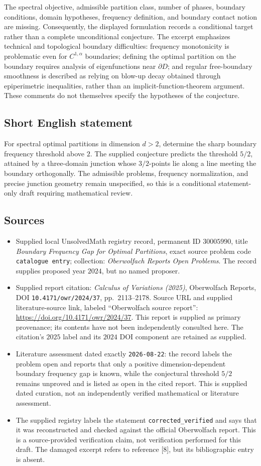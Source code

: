 \documentclass[11pt]{article}
\begin{document}
The spectral objective, admissible partition class, number of phases, boundary conditions, domain hypotheses, frequency definition, and boundary contact notion are missing. Consequently, the displayed formulation records a conditional target rather than a complete unconditional conjecture. The excerpt emphasizes technical and topological boundary difficulties: frequency monotonicity is problematic even for \(C^{1,\alpha}\) boundaries; defining the optimal partition on the boundary requires analysis of eigenfunctions near \(\partial D\); and regular free-boundary smoothness is described as relying on blow-up decay obtained through epiperimetric inequalities, rather than an implicit-function-theorem argument. These comments do not themselves specify the hypotheses of the conjecture.
\subsection{Short English statement}
For spectral optimal partitions in dimension \(d>2\), determine the sharp boundary frequency threshold above \(2\). The supplied conjecture predicts the threshold \(5/2\), attained by a three-domain junction whose \(3/2\)-points lie along a line meeting the boundary orthogonally. The admissible problems, frequency normalization, and precise junction geometry remain unspecified, so this is a conditional statement-only draft requiring mathematical review.
\subsection{Sources}
\begin{itemize}
\item Supplied local UnsolvedMath registry record, permanent ID \(30005990\), title \emph{Boundary Frequency Gap for Optimal Partitions}, exact source problem code \texttt{catalogue entry}; collection: \emph{Oberwolfach Reports Open Problems}. The record supplies proposed year \(2024\), but no named proposer.
\item Supplied report citation: \emph{Calculus of Variations (2025)}, Oberwolfach Reports, DOI \texttt{10.4171/owr/2024/37}, pp.\ 2113--2178. Source URL and supplied literature-source link, labeled ``Oberwolfach source report'': \url{https://doi.org/10.4171/owr/2024/37}. This report is supplied as primary provenance; its contents have not been independently consulted here. The citation's \(2025\) label and its \(2024\) DOI component are retained as supplied.
\item Literature assessment dated exactly \texttt{2026-08-22}: the record labels the problem open and reports that only a positive dimension-dependent boundary frequency gap is known, while the conjectural threshold \(5/2\) remains unproved and is listed as open in the cited report. This is supplied dated curation, not an independently verified mathematical or literature assessment.
\item The supplied registry labels the statement \texttt{corrected\_verified} and says that it was reconstructed and checked against the official Oberwolfach report. This is a source-provided verification claim, not verification performed for this draft. The damaged excerpt refers to reference [8], but its bibliographic entry is absent.
\end{itemize}
\end{document}
